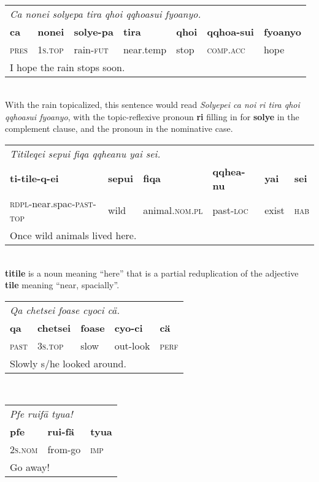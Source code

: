 \documentclass{article}
\begin{document}
\\[0.5cm]
\begin{tabular}{l l l l l l l}
\multicolumn{7}{l}{\emph{Ca nonei solyepa tira qhoi qqhoasui fyoanyo.}} \\
\textbf{ca} & \textbf{nonei} & \textbf{solye-pa} & \textbf{tira} & \textbf{qhoi} & \textbf{qqhoa-sui} & \textbf{fyoanyo} \\
\textsc{pres} & \textsc{1s.top} & rain-\textsc{fut} & near.temp & stop & \textsc{comp.acc} & hope \\
\multicolumn{7}{l}{I hope the rain stops soon.} \\
\end{tabular}
\\

With the rain topicalized, this sentence would read \emph{Solyepei ca noi ri tira qhoi qqhoasui fyoanyo}, with the topic-reflexive pronoun \textbf{ri} filling in for \textbf{solye} in the complement clause, and the pronoun in the nominative case.
\\[0.5cm]
\begin{tabular}{l l l l l l}
\multicolumn{6}{l}{\emph{Titileqei sepui fiqa qqheanu yai sei.}} \\
\textbf{ti-tile-q-ei} & \textbf{sepui} & \textbf{fiqa} & \textbf{qqhea-nu} & \textbf{yai} & \textbf{sei} \\
\textsc{rdpl}-near.spac-\textsc{past-top} & wild & animal.\textsc{nom.pl} & past-\textsc{loc} & exist & \textsc{hab} \\
\multicolumn{6}{l}{Once wild animals lived here.} \\
\end{tabular}
\\

\textbf{titile} is a noun meaning ``here'' that is a partial reduplication of the adjective \textbf{tile} meaning ``near, spacially''.
\\[0.5cm]
\begin{tabular}{l l l l l}
\multicolumn{5}{l}{\emph{Qa chetsei foase cyoci c\"a.}} \\
\textbf{qa} & \textbf{chetsei} & \textbf{foase} & \textbf{cyo-ci} & \textbf{c\"a} \\
\textsc{past} & \textsc{3s.top} & slow & out-look & \textsc{perf} \\
\multicolumn{5}{l}{Slowly s/he looked around.} \\
\end{tabular}
\\[0.5cm]
\begin{tabular}{l l l}
\multicolumn{3}{l}{\emph{Pfe ruif\"a tyua!}} \\
\textbf{pfe} & \textbf{rui-f\"a} & \textbf{tyua} \\
\textsc{2s.nom} & from-go & \textsc{imp} \\
\multicolumn{3}{l}{Go away!} \\
\end{tabular}
\\
\end{document}
